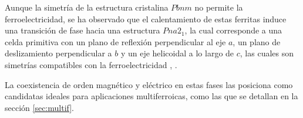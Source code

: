 \documentclass[../main.tex]{subfiles}
\begin{document}
Aunque la simetría de la estructura cristalina $Pbnm$ no permite la ferroelectricidad, se ha observado que el calentamiento de estas ferritas induce una transición de fase hacia una estructura $Pna2_1$, la cual corresponde a una celda primitiva con un plano de reflexión perpendicular al eje $a$, un plano de deslizamiento perpendicular a $b$ y un eje helicoidal a lo largo de $c$, las cuales son simetrías compatibles con la ferroelectricidad \cite{Zhang2016}, \cite{Rajaitha2022}.

La coexistencia de orden magnético y eléctrico en estas fases las posiciona como candidatas ideales para aplicaciones multiferroicas, como las que se detallan en la sección \ref{sec:multif}.
\end{document}
